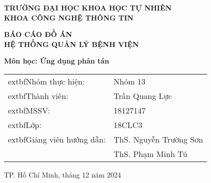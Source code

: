 \documentclass[12pt,a4paper]{report}
\begin{document}
\begin{titlepage}
    \centering
    \vspace*{1cm}
    
    {\Large\textbf{TRƯỜNG ĐẠI HỌC KHOA HỌC TỰ NHIÊN}}\\
    {\Large\textbf{KHOA CÔNG NGHỆ THÔNG TIN}}\\
    \vspace{1cm}
    \vspace{1cm}
    
    {\huge\textbf{BÁO CÁO ĐỒ ÁN}}\\
    \vspace{0.5cm}
    {\Large\textbf{HỆ THỐNG QUẢN LÝ BỆNH VIỆN}}\\
    \vspace{1cm}
    
    {\large\textbf{Môn học: Ứng dụng phân tán}}\\
    \vspace{2cm}
    
    \begin{tabular}{ll}
    	extbf{Nhóm thực hiện:} & Nhóm 13 \\
    	extbf{Thành viên:} & Trần Quang Lực \\
    	extbf{MSSV:} & 18127147 \\
    	extbf{Lớp:} & 18CLC3 \\
    	extbf{Giảng viên hướng dẫn:} & ThS. Nguyễn Trường Sơn \\
    & ThS. Phạm Minh Tú \\
    \end{tabular}
    
    \vfill
    {\large TP. Hồ Chí Minh, tháng 12 năm 2024}
\end{titlepage}
\end{document}
